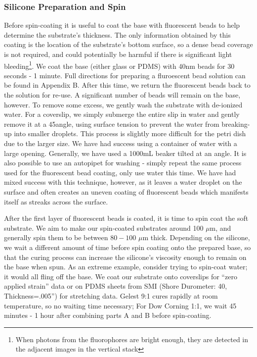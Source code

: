 \subsubsection{Silicone Preparation and Spin}
Before spin-coating it is useful to coat the base with fluorescent beads to help determine the substrate's thickness. The only information obtained by this coating is the location of the substrate's bottom surface, so a dense bead coverage is not required, and could potentially be harmful if there is significant light bleeding\footnote{When photons from the fluorophores are bright enough, they are detected in the adjacent images in the vertical stack}. We coat the base (either glass or PDMS) with 40nm beads for 30 seconds - 1 minute. Full directions for preparing a fluroescent bead solution can be found in Appendix B. After this time, we return the fluorescent beads back to the solution for re-use. A significant number of beads will remain on the base, however. To remove some excess, we gently wash the substrate with de-ionized water. For a coverslip, we simply submerge the entire slip in water and gently remove it at a 45\degree angle, using surface tension to prevent the water from breaking-up into smaller droplets. This process is slightly more difficult for the petri dish due to the larger size. We have had success using a container of water with a large opening. Generally, we have used a 1000mL beaker tilted at an angle. It is also possible to use an autopipet for washing - simply repeat the same process used for the fluorescent bead coating, only use water this time. We have had mixed success with this technique, however, as it leaves a water droplet on the surface and often creates an uneven coating of fluorescent beads which manifests itself as streaks across the surface.

After the first layer of fluorescent beads is coated, it is time to spin coat the soft substrate. We aim to make our spin-coated substrates around 100 $\mu$m, and generally spin them to be between $80-100$ $\mu$m thick. Depending on the silicone, we wait a different amount of time before spin coating onto the prepared base, so that the curing process can increase the silicone's viscosity enough to remain on the base when spun. As an extreme example, consider trying to spin-coat water; it would all fling off the base. We coat our substrate onto coverslips for ``zero applied strain'' data or on PDMS sheets from SMI (Shore Durometer: 40, Thickness=.005'') for stretching data. Gelest 9:1 cures rapidly at room temperature, so no waiting time necessary; For Dow Corning 1:1, we wait 45 minutes - 1 hour after combining parts A and B before spin-coating.

